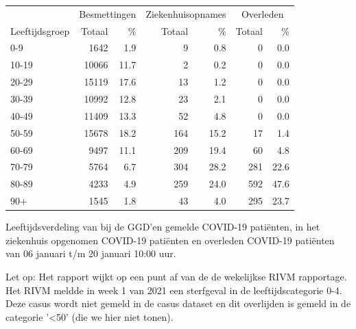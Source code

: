 \documentclass[
  english,
  man,floatsintext]{apa6}
\begin{document}
\begin{table}[H]
\centering\begingroup\fontsize{11}{13}\selectfont

\begin{threeparttable}
\begin{tabular}{lrrrrrr}
\toprule
\multicolumn{1}{c}{ } & \multicolumn{2}{c}{Besmettingen} & \multicolumn{2}{c}{Ziekenhuisopnames} & \multicolumn{2}{c}{Overleden} \\
\cmidrule(l{3pt}r{3pt}){2-3} \cmidrule(l{3pt}r{3pt}){4-5} \cmidrule(l{3pt}r{3pt}){6-7}
Leeftijdsgroep & Totaal & \% & Totaal & \% & Totaal & \%\\
\midrule
0-9 & 1642 & 1.9 & 9 & 0.8 & 0 & 0.0\\
10-19 & 10066 & 11.7 & 2 & 0.2 & 0 & 0.0\\
20-29 & 15119 & 17.6 & 13 & 1.2 & 0 & 0.0\\
30-39 & 10992 & 12.8 & 23 & 2.1 & 0 & 0.0\\
40-49 & 11409 & 13.3 & 52 & 4.8 & 0 & 0.0\\
50-59 & 15678 & 18.2 & 164 & 15.2 & 17 & 1.4\\
60-69 & 9497 & 11.1 & 209 & 19.4 & 60 & 4.8\\
70-79 & 5764 & 6.7 & 304 & 28.2 & 281 & 22.6\\
80-89 & 4233 & 4.9 & 259 & 24.0 & 592 & 47.6\\
90+ & 1545 & 1.8 & 43 & 4.0 & 295 & 23.7\\
\bottomrule
\end{tabular}
\begin{tablenotes}
\item[1] Leeftijdsverdeling van bij de GGD’en gemelde COVID-19 patiënten, in het ziekenhuis opgenomen COVID-19 patiënten en overleden COVID-19 patiënten van 06 januari t/m 20 januari 10:00 uur.
\item[2] Let op: Het rapport wijkt op een punt af van de de wekelijkse RIVM rapportage. Het RIVM meldde in week 1 van 2021 een sterfgeval in de leeftijdscategorie 0-4. Deze casus wordt niet gemeld in de casus dataset en dit overlijden is gemeld in de categorie '<50' (die we hier niet tonen).
\end{tablenotes}
\end{threeparttable}
\endgroup{}
\end{table}

\newpage
\end{document}
